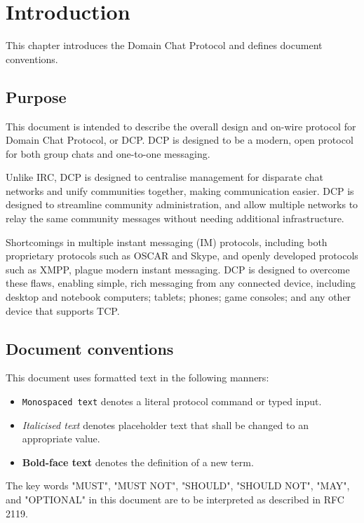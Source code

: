 \chapter{Introduction}
\label{chap:intro}
This chapter introduces the Domain Chat Protocol and defines document conventions.

\newpage



\section{Purpose}
\sectionrule
This document is intended to describe the overall design and on-wire protocol
for Domain Chat Protocol, or DCP.  DCP is designed to be a modern, open protocol
for both group chats and one-to-one messaging.

Unlike IRC\cite{rfc1459}, DCP is designed to centralise management for disparate
chat networks and unify communities together, making communication easier.  DCP
is designed to streamline community administration, and allow multiple networks
to relay the same community messages without needing additional infrastructure.

Shortcomings in multiple instant messaging (IM) protocols, including both
proprietary protocols such as OSCAR and Skype, and openly developed protocols
such as XMPP\cite{xmpp}, plague modern instant messaging.  DCP is designed to
overcome these flaws, enabling simple, rich messaging from any connected device,
including desktop and notebook computers; tablets; phones; game consoles; and
any other device that supports TCP.



\section{Document conventions}
\sectionrule
This document uses formatted text in the following manners:

\begin{itemize}
\item
\texttt{Monospaced text} denotes a literal protocol command or typed input.

\item
\textit{Italicised text} denotes placeholder text that shall be changed to an 
appropriate value.

\item
\textbf{Bold-face text} denotes the definition of a new term.
\end{itemize}

The key words "MUST", "MUST NOT", "SHOULD", "SHOULD NOT", "MAY", and "OPTIONAL"
in this document are to be interpreted as described in RFC 2119\cite{rfc2119}.